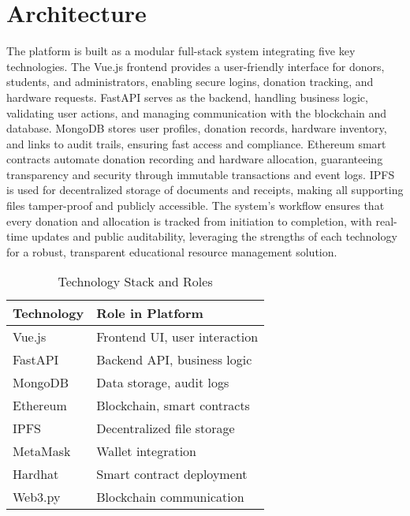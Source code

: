 \documentclass[a4paper,12pt]{report}
\begin{document}
\section{Architecture}
The platform is built as a modular full-stack system integrating five key technologies. The Vue.js frontend provides a user-friendly interface for donors, students, and administrators, enabling secure logins, donation tracking, and hardware requests. FastAPI serves as the backend, handling business logic, validating user actions, and managing communication with the blockchain and database. MongoDB stores user profiles, donation records, hardware inventory, and links to audit trails, ensuring fast access and compliance. Ethereum smart contracts automate donation recording and hardware allocation, guaranteeing transparency and security through immutable transactions and event logs. IPFS is used for decentralized storage of documents and receipts, making all supporting files tamper-proof and publicly accessible. The system’s workflow ensures that every donation and allocation is tracked from initiation to completion, with real-time updates and public auditability, leveraging the strengths of each technology for a robust, transparent educational resource management solution.

\begin{table}[ht] %
\caption{Technology Stack and Roles}
\centering
\begin{tabular}{|l|l|} %
\hline
\textbf{Technology} & \textbf{Role in Platform} \\
\hline
Vue.js & Frontend UI, user interaction \\
FastAPI & Backend API, business logic \\
MongoDB & Data storage, audit logs \\
Ethereum & Blockchain, smart contracts \\
IPFS & Decentralized file storage \\
MetaMask & Wallet integration \\
Hardhat & Smart contract deployment \\
Web3.py & Blockchain communication \\
\hline
\end{tabular}
\label{tab:techstack}
\end{table}
\end{document}
